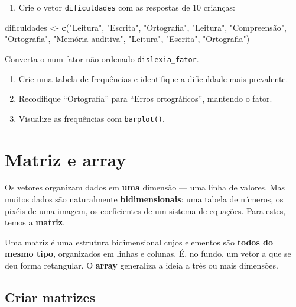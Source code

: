 \documentclass[
  portuguese,
  11pt,
  openany]{book}
\newenvironment{Shaded}{\begin{snugshade}}{\end{snugshade}}
\newcommand{\FunctionTok}[1]{\textcolor[rgb]{0.13,0.29,0.53}{\textbf{#1}}}
\newcommand{\NormalTok}[1]{#1}
\newcommand{\OtherTok}[1]{\textcolor[rgb]{0.56,0.35,0.01}{#1}}
\newcommand{\StringTok}[1]{\textcolor[rgb]{0.31,0.60,0.02}{#1}}
\providecommand{\tightlist}{%
  \setlength{\itemsep}{0pt}\setlength{\parskip}{0pt}}
\begin{document}
\begin{enumerate}
\def\labelenumi{(\alph{enumi})}
\tightlist
\item
  Crie o vetor \texttt{dificuldades} com as respostas de 10 crianças:
\end{enumerate}

\begin{Shaded}
\begin{Highlighting}[]
\NormalTok{dificuldades }\OtherTok{\textless{}{-}} \FunctionTok{c}\NormalTok{(}\StringTok{"Leitura"}\NormalTok{, }\StringTok{"Escrita"}\NormalTok{, }\StringTok{"Ortografia"}\NormalTok{, }\StringTok{"Leitura"}\NormalTok{, }\StringTok{"Compreensão"}\NormalTok{,}
  \StringTok{"Ortografia"}\NormalTok{, }\StringTok{"Memória auditiva"}\NormalTok{, }\StringTok{"Leitura"}\NormalTok{, }\StringTok{"Escrita"}\NormalTok{, }\StringTok{"Ortografia"}\NormalTok{)}
\end{Highlighting}
\end{Shaded}

Converta-o num fator não ordenado \texttt{dislexia\_fator}.

\begin{enumerate}
\def\labelenumi{(\alph{enumi})}
\setcounter{enumi}{1}
\tightlist
\item
  Crie uma tabela de frequências e identifique a dificuldade mais prevalente.
\item
  Recodifique ``Ortografia'' para ``Erros ortográficos'', mantendo o fator.
\item
  Visualize as frequências com \texttt{barplot()}.
\end{enumerate}

\section{Matriz e array}\label{matriz-e-array}

Os vetores organizam dados em \textbf{uma} dimensão --- uma linha de valores. Mas muitos
dados são naturalmente \textbf{bidimensionais}: uma tabela de números, os pixéis de
uma imagem, os coeficientes de um sistema de equações. Para estes, temos a
\textbf{matriz}.

Uma matriz é uma estrutura bidimensional cujos elementos são \textbf{todos do mesmo
tipo}, organizados em linhas e colunas. É, no fundo, um vetor a que se deu forma
retangular. O \textbf{array} generaliza a ideia a três ou mais dimensões.

\subsection{Criar matrizes}\label{criar-matrizes}
\end{document}
